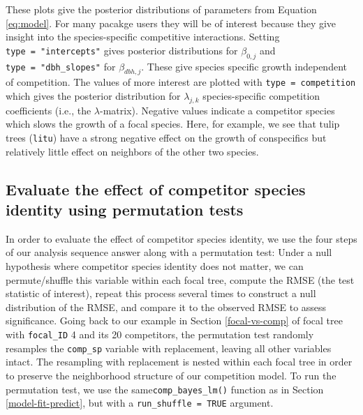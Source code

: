 \documentclass[12pt]{article}
\begin{document}
These plots give the posterior distributions of parameters from Equation
\ref{eq:model}. For many pacakge users they will be of interest because
they give insight into the species-specific competitive interactions.
Setting \texttt{type\ =\ "intercepts"} gives posterior distributions for
\(\beta_{0,j}\) and \texttt{type\ =\ "dbh\_slopes"} for
\(\beta_{dbh,j}\). These give species specific growth independent of
competition. The values of more interest are plotted with
\texttt{type\ =\ \textquotesingle{}competition\textquotesingle{}} which
gives the posterior distribution for \(\lambda_{j,k}\) species-specific
competition coefficients (i.e., the \(\lambda\)-matrix). Negative values
indicate a competitor species which slows the growth of a focal species.
Here, for example, we see that tulip trees (\texttt{litu}) have a strong
negative effect on the growth of conspecifics but relatively little
effect on neighbors of the other two species.

\hypertarget{evaluate-the-effect-of-competitor-species-identity-using-permutation-tests}{%
\subsection{Evaluate the effect of competitor species identity using
permutation
tests}\label{evaluate-the-effect-of-competitor-species-identity-using-permutation-tests}}

In order to evaluate the effect of competitor species identity, we use
the four steps of our analysis sequence answer along with a permutation
test: Under a null hypothesis where competitor species identity does not
matter, we can permute/shuffle this variable within each focal tree,
compute the RMSE (the test statistic of interest), repeat this process
several times to construct a null distribution of the RMSE, and compare
it to the observed RMSE to assess significance. Going back to our
example in Section \ref{focal-vs-comp} of focal tree with
\texttt{focal\_ID} 4 and its 20 competitors, the permutation test
randomly resamples the \texttt{comp\_sp} variable with replacement,
leaving all other variables intact. The resampling with replacement is
nested within each focal tree in order to preserve the neighborhood
structure of our competition model. To run the permutation test, we use
the same\texttt{comp\_bayes\_lm()} function as in Section
\ref{model-fit-predict}, but with a \texttt{run\_shuffle\ =\ TRUE}
argument.
\end{document}
